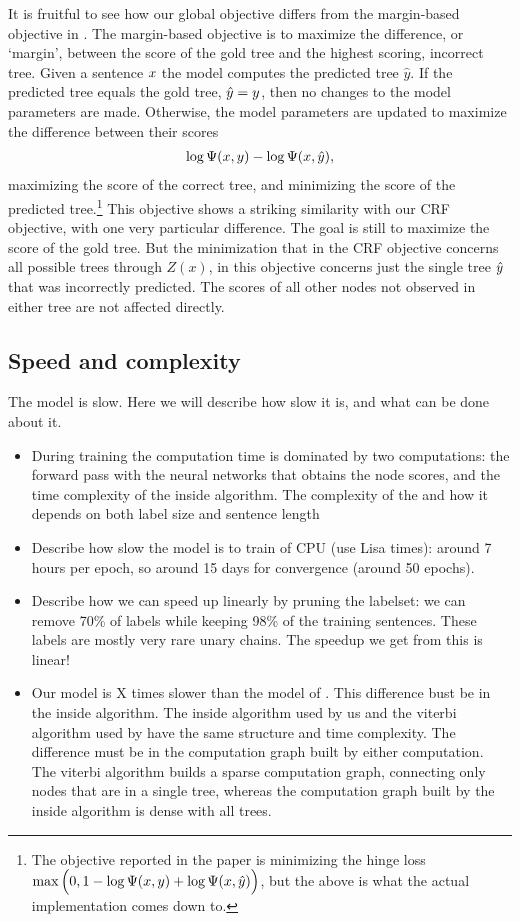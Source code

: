     It is fruitful to see how our global objective differs from the margin-based objective in \citep{stern2017minimal}. The margin-based objective is to maximize the difference, or `margin', between the score of the gold tree and the highest scoring, incorrect tree. Given a sentence $x$ the model computes the predicted tree $\hat{y}$. If the predicted tree equals the gold tree, $\hat{y} = y$, then no changes to the model parameters are made. Otherwise, the model parameters are updated to maximize the difference between their scores
    \begin{align*}
      \log \Psi(x, y) - \log \Psi(x, \hat{y}),
    \end{align*}
    maximizing the score of the correct tree, and minimizing the score of the predicted tree.\footnote{The objective reported in the paper is minimizing the hinge loss $\max \Big(0, 1 - \log \Psi(x, y) + \log \Psi(x, \hat{y}) \Big)$, but the above is what the actual implementation comes down to.} This objective shows a striking similarity with our CRF objective, with one very particular difference. The goal is still to maximize the score of the gold tree. But the minimization that in the CRF objective concerns all possible trees through $Z(x)$, in this objective concerns just the single tree $\hat{y}$ that was incorrectly predicted. The scores of all other nodes not observed in either tree are not affected directly.

  \subsection{Speed and complexity}
    The model is slow. Here we will describe how slow it is, and what can be done about it.
    \begin{itemize}
      \item During training the computation time is dominated by two computations: the forward pass with the neural networks that obtains the node scores, and the time complexity of the inside algorithm. The complexity of the and how it depends on both label size and sentence length
      \item Describe how slow the model is to train of CPU (use Lisa times): around 7 hours per epoch, so around 15 days for convergence (around 50 epochs).
      \item Describe how we can speed up linearly by pruning the labelset: we can remove 70\% of labels while keeping 98\% of the training sentences. These labels are mostly very rare unary chains. The speedup we get from this is linear!
      \item Our model is X times slower than the model of \citet{stern2017minimal}. This difference bust be in the inside algorithm. The inside algorithm used by us and the viterbi algorithm used by \citet{stern2017minimal} have the same structure and time complexity. The difference must be in the computation graph built by either computation. The viterbi algorithm builds a sparse computation graph, connecting only nodes that are in a single tree, whereas the computation graph built by the inside algorithm is dense with all trees.
    \end{itemize}

